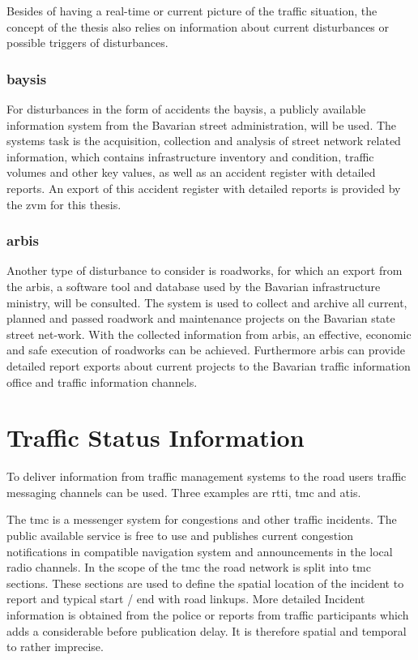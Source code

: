 \documentclass[a4paper,12pt]{report}
\begin{document}
Besides of having a real-time or current picture of the traffic situation, the concept of the thesis also relies on information about current disturbances or possible triggers of disturbances. 

\subsubsection{\acrfull{baysis}}
For disturbances in the form of accidents the \acrfull{baysis}, a publicly available information system from the Bavarian street administration, will be used. The systems task is the acquisition, collection and analysis of street network related information, which contains infrastructure inventory and condition, traffic volumes and other key values, as well as an accident register with detailed reports. An export of this accident register with detailed reports is provided by the \acrshort{zvm} for this thesis.

\subsubsection{\acrfull{arbis}}
Another type of disturbance to consider is roadworks, for which an export from the \acrfull{arbis}, a software tool and database used by the Bavarian infrastructure ministry, will be consulted. The system is used to collect and archive all current, planned and passed roadwork and maintenance projects on the Bavarian state street net-work. With the collected information from \acrshort{arbis}, an effective, economic and safe execution of roadworks can be achieved. Furthermore \acrshort{arbis} can provide detailed report exports about current projects to the Bavarian traffic information office and traffic information channels. \cite{trafficon2017}

\section{Traffic Status Information}

To deliver information from traffic management systems to the road users traffic messaging channels can be used. Three examples are \acrfull{rtti}, \acrfull{tmc} and \acrfull{atis}.

The \acrshort{tmc} is a messenger system for congestions and other traffic incidents. The public available service is free to use and publishes current congestion notifications in compatible navigation system and announcements in the local radio channels. In the scope of the \acrshort{tmc} the road network is split into \acrshort{tmc} sections. These sections are used to define the spatial location of the incident to report and typical start / end with road linkups. More detailed Incident information is obtained from the police or reports from traffic participants which adds a considerable before publication delay. It is therefore spatial and temporal to rather imprecise. \cite{LAPID2020}
\end{document}
